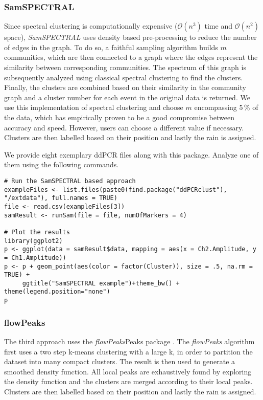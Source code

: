 \documentclass{article}
\begin{document}
\subsubsection{SamSPECTRAL}
Since spectral clustering is computationally expensive ($\mathcal{O}(n^3)$ time and $\mathcal{O}(n^2)$ space), \emph{SamSPECTRAL} uses density based pre-processing to reduce the number of edges in the graph. To do so, a faithful sampling algorithm builds $m$ communities, which are then connected to a graph where the edges represent the similarity between corresponding communities. The spectrum of this graph is subsequently analyzed using classical spectral clustering to find the clusters. Finally, the clusters are combined based on their similarity in the community graph and a cluster number for each event in the original data is returned. We use this implementation of spectral clustering and choose $m$ encompassing 5$\,$\% of the data, which has empirically proven to be a good compromise between accuracy and speed. However, users can choose a different value if necessary.
Clusters are then labelled based on their position and lastly the rain is assigned.

We provide eight exemplary ddPCR files along with this package. Analyze one of them using the following commands.
\begin{verbatim}
# Run the SamSPECTRAL based approach
exampleFiles <- list.files(paste0(find.package("ddPCRclust"), "/extdata"), full.names = TRUE)
file <- read.csv(exampleFiles[3])
samResult <- runSam(file = file, numOfMarkers = 4)

# Plot the results
library(ggplot2)
p <- ggplot(data = samResult$data, mapping = aes(x = Ch2.Amplitude, y = Ch1.Amplitude))
p <- p + geom_point(aes(color = factor(Cluster)), size = .5, na.rm = TRUE) +
     ggtitle("SamSPECTRAL example")+theme_bw() + theme(legend.position="none")
p
\end{verbatim}

\subsubsection{flowPeaks}
The third approach uses the \emph{flowPeaks}Peaks package \cite{ge2012flowpeaks}. The \emph{flowPeaks} algorithm first uses a two step k-means clustering with a large k, in order to partition the dataset into many compact clusters.
The result is then used to generate a smoothed density function.
All local peaks are exhaustively found by exploring the density function and the clusters are merged according to their local peaks. 
Clusters are then labelled based on their position and lastly the rain is assigned.
\end{document}
